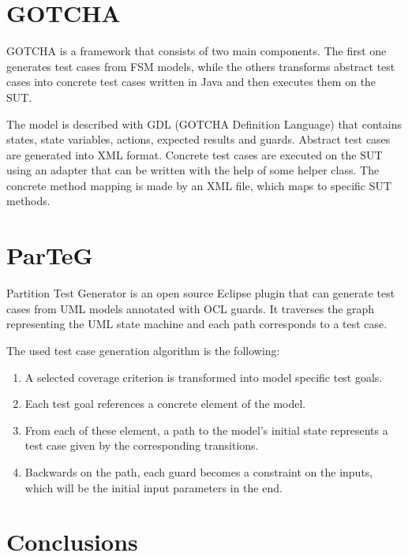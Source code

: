 
\section{GOTCHA}
\label{sec:gotcha}

GOTCHA \cite{gotcha} is a framework that consists of two main components. The first one generates test cases from FSM models, while the others transforms abstract test cases into concrete test cases written in Java and then executes them on the SUT.

The model is described with GDL (GOTCHA Definition Language) that contains states, state variables, actions, expected results and guards. Abstract test cases are generated into XML format. Concrete test cases are executed on the SUT using an adapter that can be written with the help of some helper class. The concrete method mapping is made by an XML file, which maps to specific SUT methods.


\section{ParTeG}
\label{sec:parteg}

Partition Test Generator \cite{parteg}\cite{partegweb} is an open source Eclipse plugin that can generate test cases from UML models annotated with OCL guards. It traverses the graph representing the UML state machine and each path corresponds to a test case.

The used test case generation algorithm is the following:

\begin{enumerate}
	\item A selected coverage criterion is transformed into model specific test goals.
	\item Each test goal references a concrete element of the model.
	\item From each of these element, a path to the model's initial state represents a test case given by the corresponding transitions.
	\item Backwards on the path, each guard becomes a constraint on the inputs, which will be the initial input parameters in the end.
\end{enumerate}


\section{Conclusions}
\label{sec:conclusions}

